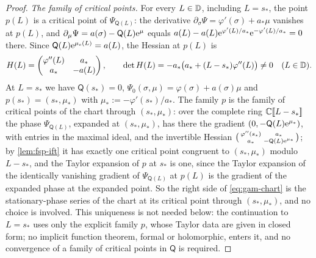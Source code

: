 \begin{proof}
\emph{The family of critical points.} For every $L\in\mathbb{D}$, including $L=s_*$, the point $p(L)$ is a critical point of $\Psi_{\mathsf Q(L)}$: the derivative $\partial_\sigma\Psi=\varphi'(\sigma)+a_*\mu$ vanishes at $p(L)$, and $\partial_\mu\Psi=a(\sigma)-\mathsf Q(L)\mathrm{e}^{\mu}$ equals $a(L)-a(L)\mathrm{e}^{\varphi'(L)/a_*}\mathrm{e}^{-\varphi'(L)/a_*}=0$ there. Since $\mathsf Q(L)\mathrm{e}^{\mu_c(L)}=a(L)$, the Hessian at $p(L)$ is
\[
H(L)=\begin{pmatrix}\varphi''(L)&a_*\\ a_*&-a(L)\end{pmatrix},\qquad \det H(L)=-a_*\bigl(a_*+(L-s_*)\varphi''(L)\bigr)\neq 0\quad(L\in\mathbb{D}).
\]
At $L=s_*$ we have $\mathsf Q(s_*)=0$, $\Psi_0(\sigma,\mu)=\varphi(\sigma)+a(\sigma)\mu$ and $p(s_*)=(s_*,\mu_*)$ with $\mu_*:=-\varphi'(s_*)/a_*$. The family $p$ is the family of critical points of the chart through $(s_*,\mu_*)$: over the complete ring $\mathbb{C}[\![ L-s_* ]\!]$ the phase $\Psi_{\mathsf Q(L)}$, expanded at $(s_*,\mu_*)$, has there the gradient $(0,-\mathsf Q(L)\mathrm{e}^{\mu_*})$, with entries in the maximal ideal, and the invertible Hessian $\bigl(\begin{smallmatrix}\varphi''(s_*)&a_*\\ a_*&-\mathsf Q(L)\mathrm{e}^{\mu_*}\end{smallmatrix}\bigr)$; by \cref{lem:fsp-ift} it has exactly one critical point congruent to $(s_*,\mu_*)$ modulo $L-s_*$, and the Taylor expansion of $p$ at $s_*$ is one, since the Taylor expansion of the identically vanishing gradient of $\Psi_{\mathsf Q(L)}$ at $p(L)$ is the gradient of the expanded phase at the expanded point. So the right side of \eqref{eq:gam-chart} is the stationary-phase series of the chart at its critical point through $(s_*,\mu_*)$, and no choice is involved. This uniqueness is not needed below: the continuation to $L=s_*$ uses only the explicit family $p$, whose Taylor data are given in closed form; no implicit function theorem, formal or holomorphic, enters it, and no convergence of a family of critical points in $\mathsf Q$ is required.


\end{proof}
